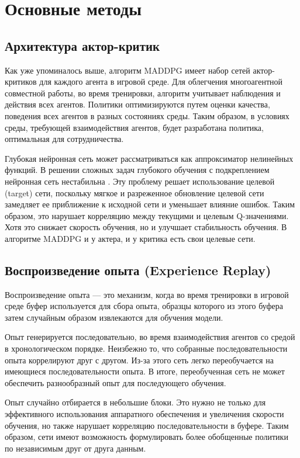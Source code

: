 \section{Основные методы}

\subsection{Архитектура актор-критик}

Как уже упоминалось выше, алгоритм MADDPG имеет набор сетей актор-критиков для каждого агента в игровой среде. Для облегчения многоагентной совместной работы, во время тренировки, алгоритм учитывает наблюдения и действия всех агентов. Политики оптимизируются путем оценки качества, поведения всех агентов в разных состояниях среды. Таким образом, в условиях среды, требующей взаимодействия агентов, будет разработана политика, оптимальная для сотрудничества.

Глубокая нейронная сеть может рассматриваться как аппроксиматор нелинейных функций. В решении сложных задач глубокого обучения с подкреплением нейронная сеть нестабильна \cite{lillicrap2015continuous}. Эту проблему решает использование целевой (target) сети, поскольку мягкое и разреженное обновление целевой сети замедляет ее приближение к исходной сети и уменьшает влияние ошибок. Таким образом, это нарушает корреляцию между текущими и целевым Q-значениями. Хотя это снижает скорость обучения, но и улучшает стабильность обучения. В алгоритме MADDPG и у актера, и у критика есть свои целевые сети.

\subsection{Воспроизведение опыта (Experience Replay)}

Воспроизведение опыта — это механизм, когда во время тренировки в игровой среде буфер используется для сбора опыта, образцы которого из этого буфера затем случайным образом извлекаются для обучения модели.

Опыт генерируется последовательно, во время взаимодействия агентов со средой в хронологическом порядке. Неизбежно то, что собранные последовательности опыта коррелируют друг с другом. Из-за этого сеть легко переобучается на имеющиеся последовательности опыта. В итоге, переобученная сеть не может обеспечить разнообразный опыт для последующего обучения.

Опыт случайно отбирается в небольшие блоки. Это нужно не только для эффективного использования аппаратного обеспечения и увеличения скорости обучения, но также нарушает корреляцию последовательности в буфере. Таким образом, сети имеют возможность формулировать более обобщенные политики по независимым друг от друга данным.

